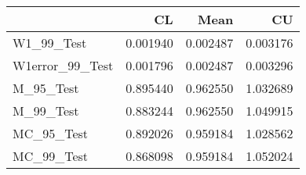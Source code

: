 \begin{tabular}{lrrr}
\toprule
{} &        CL &      Mean &        CU \\
\midrule
W1\_99\_Test      &  0.001940 &  0.002487 &  0.003176 \\
W1error\_99\_Test &  0.001796 &  0.002487 &  0.003296 \\
M\_95\_Test       &  0.895440 &  0.962550 &  1.032689 \\
M\_99\_Test       &  0.883244 &  0.962550 &  1.049915 \\
MC\_95\_Test      &  0.892026 &  0.959184 &  1.028562 \\
MC\_99\_Test      &  0.868098 &  0.959184 &  1.052024 \\
\bottomrule
\end{tabular}
